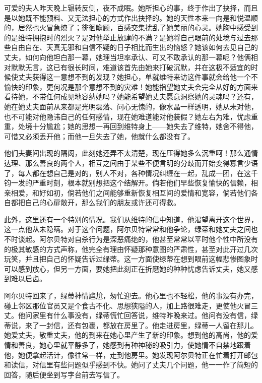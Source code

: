 \documentclass[12pt,oneside]{book}
\begin{document}
\begin{framed}
可爱的夫人昨天晚上辗转反侧，夜不成眠。她所担心的事，终于作出了抉择，而且是以她既不能预料、又无法担心的方式作出抉择的。她的天性本来一向是和悦温顺的，居然也火冒急燎了；徘徊瞻顾，百感交集扰乱了她美丽的心灵。她胸中感受到的是维特拥抱时的烈火？是对他举止放肆的不满？是她将自己眼前的处境与过去那些自由自在、天真无邪和自信不疑的日子相比而生出的恼怒？她该如何去见自己的丈夫，如何向他坦白那一幕，她理当坦率承认、可又不敢承认的那一幕呢？他俩相对默默无言，这已有很长时间，难道该首先由她来打破沉默，并在这极不适宜的时候使丈夫获得这一意想不到的发现？她担心，单就维特来访这件事就会给他一个不愉快的印象，更何况是那个意想不到的灾难！她能指望她丈夫会完全从好的方面来看待她，不带任何成见地容纳她吗？她能希望她丈夫愿意洞察她的灵魂吗？还有，她在她丈夫面前从来都是光明磊落、问心无愧的，像水晶一样透明，她从未对他，也不可能对他隐讳自己的任何感情，现在她难道能对他装假？她左右为难，忧虑重重，处境十分尴尬；她的思想一再回到维特身上——她失去了维特，她舍不得他，可惜又必须丢开他；而他一旦失去了她，他就什么都没有了。

他们夫妻间出现的隔阂，此刻她还弄不太清楚，现在压得她多么沉重呵！那么通情达理、那么善良的两个人，相互之间由于某些不便言明的分歧而开始变得寡言少语了，每人都在想自己是对的，别人不对，各种情况纠缠在一起，乱成一团，在这千钧一发的严重时刻，根本就别想把这个结解开。倘若他们早些恢复愉快的信赖，相亲相爱，和好如初，倘若他们之间能够重新恢复相互间的爱情和宽容，倘若他们各自都把自己的心扉敞开，那么我们的朋友或许还可得救。

此外，这里还有一个特别的情况。我们从维特的信中知道，他渴望离开这个世界，这一点他从未隐瞒。对于这个问题，阿尔贝特常常和他争论，绿蒂和她丈夫之间也不时谈起。阿尔贝特对自杀行为是深恶痛绝的，他甚至常常以平时他个性中所没有的极其敏感的方式声称，他完全有理由怀疑那种意图的严肃性，甚至对此开过几次玩笑，并且把自己的怀疑告诉过绿蒂。这一方面使绿蒂在想到眼前这幅悲惨图象时可以感到放心，但另一方面，要她把此刻正在折磨她的种种忧虑告诉丈夫，她又感到难以启齿。

阿尔贝特回来了，绿蒂神情尴尬，匆忙迎去。他心里也不轻松，他的事没有办完，碰上邻区那位官员又是个食古不化、思想狭隘的人，加上路很难走，更使他火冒三丈。他问家里有什么事没有，绿蒂慌忙回答说，维特昨晚来过。他问有没有信，绿蒂说，来了一封信，还有包裹，都放在房里了。他走进房里，绿蒂一人留在那儿。她爱丈夫，敬重丈夫，他的到来在她心里产生了新的印象。想到他的高尚，他的爱情和善良，她心里就平静多了，她感到有种神秘的吸引力，使她情不自禁地跟着他，她便拿起活计，像往常一样，走到他房里。她发现阿尔贝特正在忙着打开邮包和读信，对信里有些问题似乎感到不快。她问了丈夫几个问题，他一一作了简短的回答，随后便坐到写字台前去写信了。


\end{framed}
\end{document}
